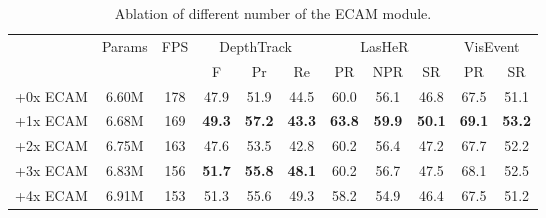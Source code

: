 \begin{table}[]
\centering
\footnotesize
\renewcommand{\arraystretch}{1.05}
\setlength{\tabcolsep}{1.1pt}

\begin{tabular}{c|c|c|ccc|ccc|cc}
\hline
\multirow{2}{*}{} & \multirow{2}{*}{Params} & \multirow{2}{*}{FPS} & \multicolumn{3}{c|}{DepthTrack~\cite{depthtrack}} & \multicolumn{3}{c|}{LasHeR~\cite{lasher}} & \multicolumn{2}{c}{VisEvent~\cite{visevent}} \\ \cline{4-11} 
                  &                         &                      & F            & Pr           & Re      & PR      & NPR     & SR      & PR            & SR           \\ \hline
+0x ECAM          & 6.60M                   & 178                  & 47.9         & 51.9         & 44.5    & 60.0    & 56.1    & 46.8    & 67.5          & 51.1         \\
+1x ECAM          & 6.68M                   & 169                  & \textbf{49.3}& \textbf{57.2}& \textbf{43.3} & \textbf{63.8} & \textbf{59.9} & \textbf{50.1} & \textbf{69.1} & \textbf{53.2}         \\
+2x ECAM          & 6.75M                   & 163                  & 47.6         & 53.5         & 42.8    & 60.2    & 56.4    & 47.2    & 67.7          & 52.2         \\
+3x ECAM          & 6.83M                   & 156                  & \textbf{51.7}& \textbf{55.8}& \textbf{48.1}    & 60.2    & 56.7    & 47.5    & 68.1          & 52.5         \\ 
+4x ECAM          & 6.91M                   & 153                  & 51.3         & 55.6         & 49.3    & 58.2 & 54.9  & 46.4    & 67.5          & 51.2        \\ \hline
\end{tabular}
\caption{Ablation of different number of the ECAM module. }
\label{table ablation number ecm}
\end{table}